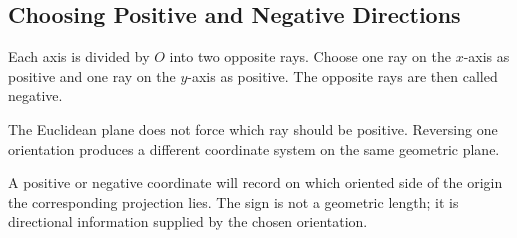 \subsection{Choosing Positive and Negative Directions}

\begin{derivationbox}
Each axis is divided by $O$ into two opposite rays. Choose one ray on the
$x$-axis as positive and one ray on the $y$-axis as positive. The opposite rays
are then called negative.
\end{derivationbox}

\begin{corebox}
The Euclidean plane does not force which ray should be positive. Reversing one
orientation produces a different coordinate system on the same geometric
plane.
\end{corebox}

\begin{center}
\end{center}

\begin{interpretationbox}
A positive or negative coordinate will record on which oriented side of the
origin the corresponding projection lies. The sign is not a geometric length;
it is directional information supplied by the chosen orientation.
\end{interpretationbox}
